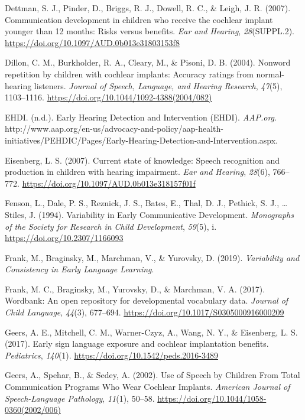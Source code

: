 \documentclass[english,man]{apa6}
\begin{document}
\leavevmode\hypertarget{ref-dettman2007}{}%
Dettman, S. J., Pinder, D., Briggs, R. J., Dowell, R. C., \& Leigh, J. R. (2007). Communication development in children who receive the cochlear implant younger than 12 months: Risks versus benefits. \emph{Ear and Hearing}, \emph{28}(SUPPL.2). \url{https://doi.org/10.1097/AUD.0b013e31803153f8}

\leavevmode\hypertarget{ref-dillon2004}{}%
Dillon, C. M., Burkholder, R. A., Cleary, M., \& Pisoni, D. B. (2004). Nonword repetition by children with cochlear implants: Accuracy ratings from normal-hearing listeners. \emph{Journal of Speech, Language, and Hearing Research}, \emph{47}(5), 1103--1116. \url{https://doi.org/10.1044/1092-4388(2004/082)}

\leavevmode\hypertarget{ref-ehdi}{}%
EHDI. (n.d.). Early Hearing Detection and Intervention (EHDI). \emph{AAP.org}. http://www.aap.org/en-us/advocacy-and-policy/aap-health-initiatives/PEHDIC/Pages/Early-Hearing-Detection-and-Intervention.aspx.

\leavevmode\hypertarget{ref-eisenberg2007}{}%
Eisenberg, L. S. (2007). Current state of knowledge: Speech recognition and production in children with hearing impairment. \emph{Ear and Hearing}, \emph{28}(6), 766--772. \url{https://doi.org/10.1097/AUD.0b013e318157f01f}

\leavevmode\hypertarget{ref-fenson1994}{}%
Fenson, L., Dale, P. S., Reznick, J. S., Bates, E., Thal, D. J., Pethick, S. J., \ldots{} Stiles, J. (1994). Variability in Early Communicative Development. \emph{Monographs of the Society for Research in Child Development}, \emph{59}(5), i. \url{https://doi.org/10.2307/1166093}

\leavevmode\hypertarget{ref-frank2019}{}%
Frank, M., Braginsky, M., Marchman, V., \& Yurovsky, D. (2019). \emph{Variability and Consistency in Early Language Learning}.

\leavevmode\hypertarget{ref-frank2017}{}%
Frank, M. C., Braginsky, M., Yurovsky, D., \& Marchman, V. A. (2017). Wordbank: An open repository for developmental vocabulary data. \emph{Journal of Child Language}, \emph{44}(3), 677--694. \url{https://doi.org/10.1017/S0305000916000209}

\leavevmode\hypertarget{ref-geers2017}{}%
Geers, A. E., Mitchell, C. M., Warner-Czyz, A., Wang, N. Y., \& Eisenberg, L. S. (2017). Early sign language exposure and cochlear implantation benefits. \emph{Pediatrics}, \emph{140}(1). \url{https://doi.org/10.1542/peds.2016-3489}

\leavevmode\hypertarget{ref-geers2002}{}%
Geers, A., Spehar, B., \& Sedey, A. (2002). Use of Speech by Children From Total Communication Programs Who Wear Cochlear Implants. \emph{American Journal of Speech-Language Pathology}, \emph{11}(1), 50--58. \url{https://doi.org/10.1044/1058-0360(2002/006)}
\end{document}
